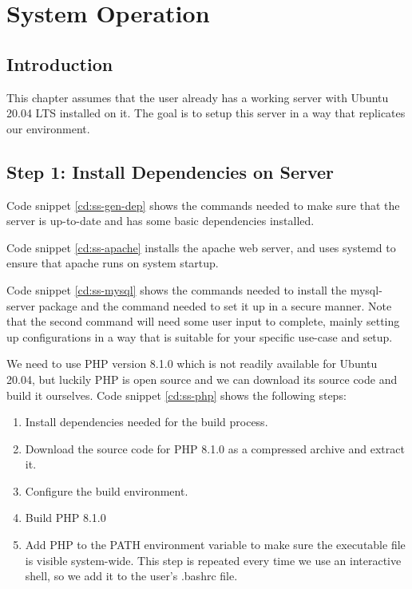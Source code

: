 \chapter{System Operation}
\label{ch:res-conc}
\section{Introduction}
This chapter assumes that the user already has a working server with Ubuntu 20.04 LTS installed on it. The goal is to setup this server in a way that replicates our environment.
\section{Step 1: Install Dependencies on Server}
Code snippet \ref{cd:ss-gen-dep} shows the commands needed to make sure that the server is up-to-date and has some basic dependencies installed.


Code snippet \ref{cd:ss-apache} installs the apache web server, and uses systemd to ensure that apache runs on system startup.


Code snippet \ref{cd:ss-mysql} shows the commands needed to install the mysql-server package and the command needed to set it up in a secure manner. Note that the second command will need some user input to complete, mainly setting up configurations in a way that is suitable for your specific use-case and setup.
\newpage


We need to use PHP version 8.1.0 which is not readily available for Ubuntu 20.04, but luckily PHP is open source and we can download its source code and build it ourselves. Code snippet \ref{cd:ss-php} shows the following steps:
\begin{enumerate}
	\item Install dependencies needed for the build process.
	\item Download the source code for PHP 8.1.0 as a compressed archive and extract it.
	\item Configure the build environment.
	\item Build PHP 8.1.0
	\item Add PHP to the PATH environment variable to make sure the executable file is visible system-wide. This step is repeated every time we use an interactive shell, so we add it to the user's .bashrc file.
\end{enumerate}



